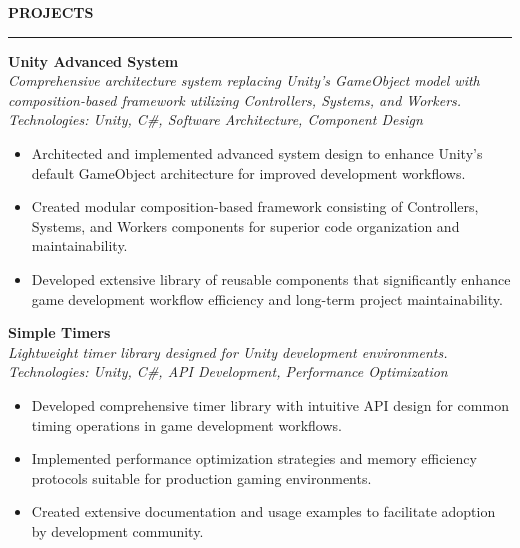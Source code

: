 \documentclass[a4paper,10pt]{article}
\newcommand{\sectionheading}[1]{%
  \addvspace{\medskipamount}%
  {\large\bfseries\MakeUppercase{#1}} %
  \noindent\rule{\linewidth}{0.4pt}%
  \vspace{\smallskipamount}%
}
\begin{document}
\sectionheading{Projects}

\textbf{Unity Advanced System}\\
\textit{Comprehensive architecture system replacing Unity's GameObject model with composition-based framework utilizing Controllers, Systems, and Workers.}\\
\textit{Technologies: Unity, C\#, Software Architecture, Component Design}
\begin{itemize}[nosep]
    \item Architected and implemented advanced system design to enhance Unity's default GameObject architecture for improved development workflows.
    \item Created modular composition-based framework consisting of Controllers, Systems, and Workers components for superior code organization and maintainability.
    \item Developed extensive library of reusable components that significantly enhance game development workflow efficiency and long-term project maintainability.
\end{itemize}

\addvspace{\medskipamount}

\textbf{Simple Timers}\\
\textit{Lightweight timer library designed for Unity development environments.}\\
\textit{Technologies: Unity, C\#, API Development, Performance Optimization}
\begin{itemize}[nosep]
    \item Developed comprehensive timer library with intuitive API design for common timing operations in game development workflows.
    \item Implemented performance optimization strategies and memory efficiency protocols suitable for production gaming environments.
    \item Created extensive documentation and usage examples to facilitate adoption by development community.
\end{itemize}

\addvspace{\medskipamount}
\end{document}
